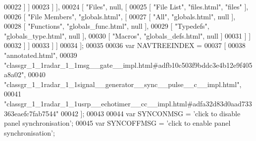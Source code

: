 \begin{DoxyCode}
00022       ] ]
00023     ] ],
00024     [ \textcolor{stringliteral}{"Files"}, null, [
00025       [ \textcolor{stringliteral}{"File List"}, \textcolor{stringliteral}{"files.html"}, \textcolor{stringliteral}{"files"} ],
00026       [ \textcolor{stringliteral}{"File Members"}, \textcolor{stringliteral}{"globals.html"}, [
00027         [ \textcolor{stringliteral}{"All"}, \textcolor{stringliteral}{"globals.html"}, null ],
00028         [ \textcolor{stringliteral}{"Functions"}, \textcolor{stringliteral}{"globals\_func.html"}, null ],
00029         [ \textcolor{stringliteral}{"Typedefs"}, \textcolor{stringliteral}{"globals\_type.html"}, null ],
00030         [ \textcolor{stringliteral}{"Macros"}, \textcolor{stringliteral}{"globals\_defs.html"}, null ]
00031       ] ]
00032     ] ]
00033   ] ]
00034 ];
00035 
00036 var NAVTREEINDEX =
00037 [
00038 \textcolor{stringliteral}{"annotated.html"},
00039 \textcolor{stringliteral}{"classgr\_1\_1radar\_1\_1msg\_\_gate\_\_impl.html#adfb10c503f9bddc3e4b12e9f405a8a02"},
00040 \textcolor{stringliteral}{"classgr\_1\_1radar\_1\_1signal\_\_generator\_\_sync\_\_pulse\_\_c\_\_impl.html"},
00041 \textcolor{stringliteral}{"classgr\_1\_1radar\_1\_1usrp\_\_echotimer\_\_cc\_\_impl.html#adfa32d83d0aad733363eaefc7fab7544"}
00042 ];
00043 
00044 var SYNCONMSG = \textcolor{stringliteral}{'click to disable panel synchronisation'};
00045 var SYNCOFFMSG = \textcolor{stringliteral}{'click to enable panel synchronisation'};
\end{DoxyCode}
